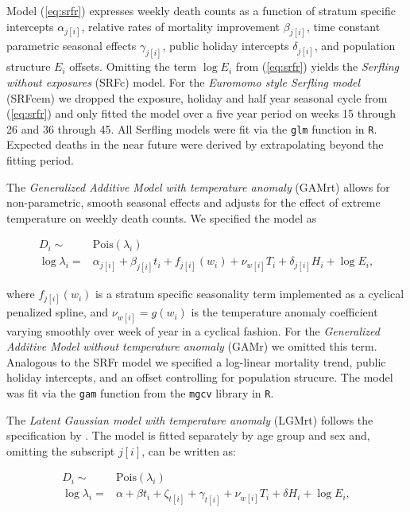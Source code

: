 \documentclass[12pt]{article}
\begin{document}
\begin{appendix}
Model (\ref{eq:srfr}) expresses weekly death counts as a function of stratum specific intercepts $\alpha_{j[i]}$, relative rates of mortality improvement $\beta_{j[i]}$, time constant parametric seasonal effects $\gamma_{j[i]}$, public holiday intercepts $\delta_{j[i]}$, and population structure $E_i$ offsets. Omitting the term $\log E_i$ from (\ref{eq:srfr}) yields the \emph{Serfling without exposures} (SRFc) model. For the \emph{Euromomo style Serfling model} (SRFcem) we dropped the exposure, holiday and half year seasonal cycle from (\ref{eq:srfr}) and only fitted the model over a five year period on weeks 15 through 26 and 36 through 45. All Serfling models were fit via the \texttt{glm} function in \texttt{R}. Expected deaths in the near future were derived by extrapolating beyond the fitting period.

The \emph{Generalized Additive Model with temperature anomaly} (GAMrt) allows for non-parametric, smooth seasonal effects and adjusts for the effect of extreme temperature on weekly death counts. We specified the model as

\begin{equation}
  \begin{aligned}
    D_i \sim& \text{Pois}(\lambda_i) \\
    \log \lambda_i =& \alpha_{j[i]} + \beta_{j[i]}t_i + f_{j[i]}(w_i) + \nu_{w[i]} T_i + \delta_{j[i]}H_i + \log E_i,
  \end{aligned}
  \label{eq:gamrt}
\end{equation}

where $f_{j[i]}(w_i)$ is a stratum specific seasonality term implemented as a cyclical penalized spline, and $\nu_{w[i]}=g(w_i)$ is the temperature anomaly coefficient varying smoothly over week of year in a cyclical fashion. For the \emph{Generalized Additive Model without temperature anomaly} (GAMr) we omitted this term. Analogous to the SRFr model we specified a log-linear mortality trend, public holiday intercepts, and an offset controlling for population strucure. The model was fit via the \texttt{gam} function from the \texttt{mgcv} library in \texttt{R}.

The \emph{Latent Gaussian model with temperature anomaly} (LGMrt) follows the specification by \cite{Kontis2020}. The model is fitted separately by age group and sex and, omitting the subscript $j[i]$, can be written as:

\begin{equation}
  \begin{aligned}
    D_i \sim& \text{Pois}(\lambda_i) \\
    \log \lambda_i =& \alpha + \beta t_i +
    \zeta_{t[i]} + \gamma_{t[i]} +
    \nu_{w[i]} T_i + \delta H_i + \log E_i,
  \end{aligned}
  \label{eq:lgmrt}
\end{equation}


\end{appendix}
\end{document}
